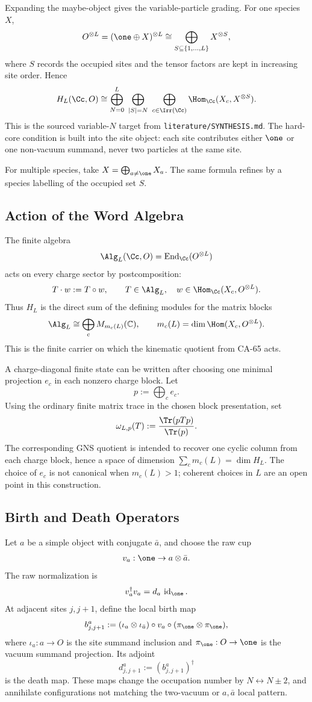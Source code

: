 Expanding the maybe-object gives the variable-particle grading.  For one
species \(X\),
\[
  O^{\otimes L}
  =
  (\one\oplus X)^{\otimes L}
  \cong
  \bigoplus_{S\subseteq\{1,\ldots,L\}} X^{\otimes S},
\]
where \(S\) records the occupied sites and the tensor factors are kept in
increasing site order.  Hence
\[
  H_L(\Cc,O)
  \cong
  \bigoplus_{N=0}^{L}\ 
  \bigoplus_{|S|=N}\ 
  \bigoplus_{c\in\Irr(\Cc)}
  \Hom_{\Cc}(X_c,X^{\otimes S}).
\]
This is the sourced variable-\(N\) target from \texttt{literature/SYNTHESIS.md}.
The hard-core condition is built into the site object: each site contributes
either \(\one\) or one non-vacuum summand, never two particles at the same site.

For multiple species, take \(X=\bigoplus_{a\neq\one}X_a\).  The same formula
refines by a species labelling of the occupied set \(S\).

\subsection{Action of the Word Algebra}

The finite algebra
\[
  \Alg_L(\Cc,O)=\operatorname{End}_{\Cc}(O^{\otimes L})
\]
acts on every charge sector by postcomposition:
\[
  T\cdot w:=T\circ w,\qquad
  T\in\Alg_L,\quad w\in\Hom_{\Cc}(X_c,O^{\otimes L}).
\]
Thus \(H_L\) is the direct sum of the defining modules for the matrix blocks
\[
  \Alg_L\cong\bigoplus_c M_{m_c(L)}(\mathbb C),
  \qquad
  m_c(L)=\dim\Hom(X_c,O^{\otimes L}).
\]
This is the finite carrier on which the kinematic quotient from CA-65 acts.

A charge-diagonal finite state can be written after choosing one minimal
projection \(e_c\) in each nonzero charge block.  Let
\[
  p:=\bigoplus_c e_c .
\]
Using the ordinary finite matrix trace in the chosen block presentation, set
\[
  \omega_{L,p}(T)
  :=
  \frac{\Tr(pTp)}{\Tr(p)}.
\]
The corresponding GNS quotient is intended to recover one cyclic column from
each charge block, hence a space of dimension \(\sum_c m_c(L)=\dim H_L\).
The choice of \(e_c\) is not canonical when \(m_c(L)>1\); coherent choices in
\(L\) are an open point in this construction.

\subsection{Birth and Death Operators}

Let \(a\) be a simple object with conjugate \(\bar a\), and choose the raw cup
\[
  v_a:\one\to a\otimes\bar a .
\]
The raw normalization is
\[
  v_a^\dagger v_a=d_a\,\operatorname{id}_{\one}.
\]
At adjacent sites \(j,j+1\), define the local birth map
\[
  b^a_{j,j+1}
  :=
  (\iota_a\otimes\iota_{\bar a})
  \circ v_a
  \circ
  (\pi_{\one}\otimes\pi_{\one}),
\]
where \(\iota_a:a\to O\) is the site summand inclusion and
\(\pi_{\one}:O\to\one\) is the vacuum summand projection.  Its adjoint
\[
  d^a_{j,j+1}:=(b^a_{j,j+1})^\dagger
\]
is the death map.  These maps change the occupation number by \(N\leftrightarrow
N\pm2\), and annihilate configurations not matching the two-vacuum or
\(a,\bar a\) local pattern.

